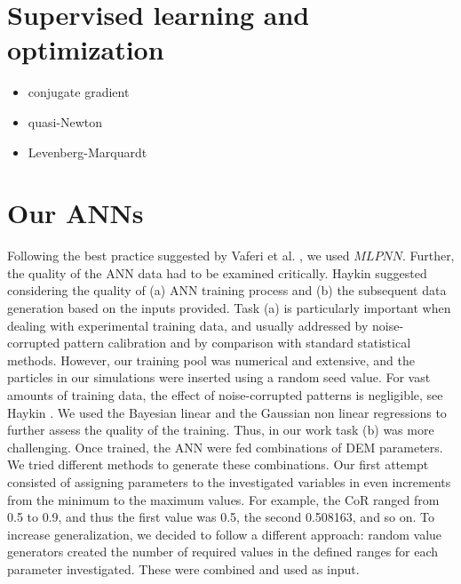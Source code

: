 \section{Supervised learning and optimization}
\label{sec:supervisedlearningandoptimization}


\begin{itemize}
  \item{conjugate gradient }
  \item{quasi-Newton}
  \item{Levenberg-Marquardt}
\end{itemize}

\section{Our ANNs}
\label{sec:ouranns}


Following the best practice suggested by Vaferi et al. \cite{RefWorks:150}, we
used $MLPNN$.
Further, the quality of the \acs{ANN} data had to be examined critically. 
Haykin \cite{RefWorks:158} 
suggested considering the quality of (a) \acs{ANN} training process and (b) the
subsequent data generation based on the inputs provided.
Task (a) is particularly important
when dealing with experimental training data, and
usually addressed
by noise-corrupted pattern calibration
and by comparison with standard statistical methods.
However, our training pool was numerical and extensive, 
and the particles in our simulations were inserted using a random
seed value.
For vast amounts of training data, the effect of noise-corrupted patterns is
negligible, see Haykin \cite{RefWorks:158}.
We used the Bayesian linear and the Gaussian non linear regressions to further
assess the quality of the training.
Thus, in our work task (b) was more challenging.
Once trained, the \acs{ANN} were fed
combinations of \acs{DEM} parameters. 
We tried different methods to generate these combinations. 
Our first attempt consisted of assigning parameters to the investigated
variables in even increments from the minimum to the maximum values. 
For example, the \acs{CoR} ranged from 0.5 to 0.9, and thus the first value was
0.5, the second 0.508163, and so on.
To increase generalization, we decided to follow a different approach: 
random value generators created the number of required values in the defined
ranges for each parameter investigated.
These were combined and used as input.\\
